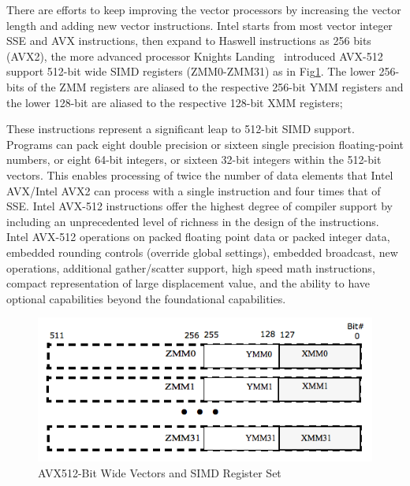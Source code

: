 \documentclass[sigconf]{acmart}
\begin{document}
There are efforts to keep improving the vector processors by increasing the vector
length and adding new vector instructions.
Intel starts from most vector integer SSE and AVX instructions, then expand to
Haswell instructions as 256 bits (AVX2),
the more advanced processor Knights Landing~\cite{avx-info} introduced
AVX-512~\cite{Intelref} support 512-bit wide SIMD registers (ZMM0-ZMM31)
as in Fig\ref{fig:avx_mms}. The lower 256-bits of the ZMM registers are
aliased to the respective 256-bit YMM registers and the lower 128-bit are
aliased to the respective 128-bit XMM registers;
%

These instructions represent a significant leap to 512-bit SIMD support. Programs
can pack eight double precision or sixteen single precision floating-point numbers,
or eight 64-bit integers, or sixteen 32-bit integers within the 512-bit vectors.
This enables processing of twice the number of data elements that Intel AVX/Intel
AVX2 can process with a single instruction and four times that of SSE.
%
Intel AVX-512 instructions offer the highest degree of compiler support by including
an unprecedented level of richness in the design of the instructions. Intel AVX-512
operations on packed floating point data or packed integer data, embedded
rounding controls (override global settings), embedded broadcast, new operations, additional
gather/scatter support, high speed math instructions, compact representation of
large displacement value, and the ability to have optional capabilities beyond
the foundational capabilities.

\begin{figure}[h]
    \centering
    \includegraphics[width=\linewidth]{avx_mms.png}
    \caption{AVX512-Bit Wide Vectors and SIMD Register Set}
    \label{fig:avx_mms}
\end{figure}
\end{document}
